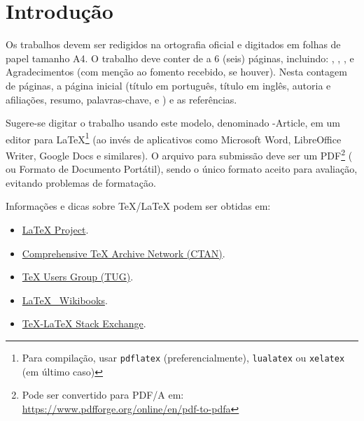 \documentclass[%
  a4paper,%
  12pt,%
  fleqn,%
  english,%
  brazilian,%
]{article}
\begin{document}
% 

\section{Introdução}%
\label{sect:intro}

Os trabalhos devem ser redigidos na ortografia oficial e digitados em folhas de papel tamanho A4.
O trabalho deve conter de  a 6 (seis) páginas, incluindo: , , ,  e Agradecimentos (com menção ao fomento recebido, se houver).
Nesta contagem de páginas,  a página inicial (título em português, título em inglês, autoria e afiliações, resumo, palavras-chave,  e ) e as referências.

Sugere-se digitar o trabalho usando este modelo, denominado \UTFPR-Article, em um editor para \LaTeX{}\footnote{Para compilação, usar \texttt{pdflatex} (preferencialmente), \texttt{lualatex} ou \texttt{xelatex} (em último caso)} (ao invés de aplicativos como Microsoft\textsuperscript{\textregistered} Word\textsuperscript{\textregistered}, LibreOffice\textsuperscript{\textregistered} Writer, Google Docs e similares).
O arquivo para submissão deve ser um PDF\footnote{Pode ser convertido para PDF/A em: \url{https://www.pdfforge.org/online/en/pdf-to-pdfa}} ( ou Formato de Documento Portátil), sendo o único formato aceito para avaliação, evitando problemas de formatação.

Informações e dicas sobre \TeX{}/\LaTeX{} podem ser obtidas em:

\begin{itemize}
\item \href{https://www.latex-project.org/}{\LaTeX{} Project\LinkIcon}.
\item \href{https://www.ctan.org/}{Comprehensive \TeX{} Archive Network (CTAN)\LinkIcon}.
\item \href{https://www.tug.org/}{\TeX{} Users Group (TUG)\LinkIcon}.
\item \href{https://en.wikibooks.org/wiki/LaTeX/}{\LaTeX{} \textemdash\ Wikibooks\LinkIcon}.
\item \href{https://tex.stackexchange.com/}{\TeX{}-\LaTeX{} Stack Exchange\LinkIcon}.
\end{itemize}
\end{document}
